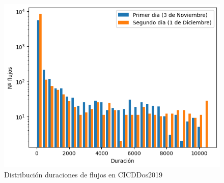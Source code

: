 \begin{figure}[H]
    \begin{center}
        \includegraphics[width=0.49\linewidth]{media/cicddos_2019_pcap_duration_distribution.png}
    \end{center}
    \captionsetup{justification=centering}
    \caption{Distribución duraciones de flujos en CICDDos2019}\label{fig:cicddos_2019_pcap_duration_distribution}
\end{figure}

